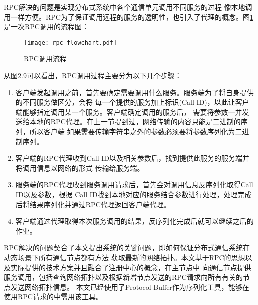 RPC解决的问题是实现分布式系统中各个通信单元调用不同服务的过程
像本地调用一样方便。RPC为了保证调用远程的服务的透明性，也引入了代理的概念\cite{5694349}。图\ref{rpc_flowchart}是一次RPC调用的流程图：
\begin{figure}[H]
  \centering
  \texttt{[image: rpc\_flowchart.pdf]}
  \caption{RPC调用流程}
  \label{rpc_flowchart}
\end{figure}
从图2.9可以看出，RPC调用过程主要分为以下几个步骤：
\begin{enumerate}
  \item 客户端发起调用之前，首先要确定需要调用什么服务。服务端为了将自身提供的不同服务做区分，会将
  每一个提供的服务加上标识(Call ID)，以此让客户端能够指定调用某一个服务。客户端确定调用的服务后，
  需要将参数一并发送给本地的RPC代理。在上一节提到过，网络传输的内容只能是二进制的序列，所以客户端
  如果需要传输字符串之外的参数必须要将参数序列化为二进制序列。
  \item 客户端的RPC代理收到Call ID以及相关参数后，找到提供此服务的服务端并将调用信息以网络的形式
  传输给服务端。
  \item 服务端的RPC代理收到服务调用请求后，首先会对调用信息反序列化取得Call ID以及参数，根据
  Call ID找到本地对应的服务结合参数进行处理，处理完成后将结果序列化并通过RPC代理返回客户端代理。
  \item 客户端通过代理取得本次服务调用的结果，反序列化完成后就可以继续之后的作业。
\end{enumerate}

RPC解决的问题契合了本文提出系统的关键问题，即如何保证分布式通信系统在动态场景下所有通信节点都有方法
获取最新的网络拓扑。本文基于RPC的思想以及实际提供的技术方案并且融合了注册中心的概念，在主节点中
向通信节点提供服务调用，包括查询网络拓扑以及根据新增节点发送的RPC请求向所有有关的节点发送网络拓扑信息。
本文已经使用了Protocol Buffer作为序列化工具，能够在使用RPC请求的中需用该工具。

